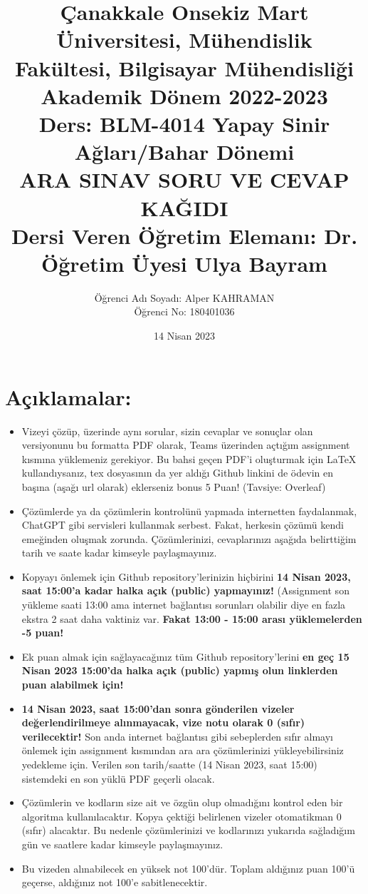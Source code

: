 \documentclass[11pt]{article}
\title{Çanakkale Onsekiz Mart Üniversitesi, Mühendislik Fakültesi, Bilgisayar Mühendisliği Akademik Dönem 2022-2023\\
Ders: BLM-4014 Yapay Sinir Ağları/Bahar Dönemi\\ 
ARA SINAV SORU VE CEVAP KAĞIDI\\
Dersi Veren Öğretim Elemanı: Dr. Öğretim Üyesi Ulya Bayram}
\author{%
\begin{minipage}{\textwidth}
\raggedright
Öğrenci Adı Soyadı: Alper KAHRAMAN\\ %
Öğrenci No: 180401036
\end{minipage}%
}
\date{14 Nisan 2023}
\begin{document}
\maketitle

\vspace{-.5in}
\section*{Açıklamalar:}
\begin{itemize}
    \item Vizeyi çözüp, üzerinde aynı sorular, sizin cevaplar ve sonuçlar olan versiyonunu bu formatta PDF olarak, Teams üzerinden açtığım assignment kısmına yüklemeniz gerekiyor. Bu bahsi geçen PDF'i oluşturmak için LaTeX kullandıysanız, tex dosyasının da yer aldığı Github linkini de ödevin en başına (aşağı url olarak) eklerseniz bonus 5 Puan! (Tavsiye: Overleaf)
    \item Çözümlerde ya da çözümlerin kontrolünü yapmada internetten faydalanmak, ChatGPT gibi servisleri kullanmak serbest. Fakat, herkesin çözümü kendi emeğinden oluşmak zorunda. Çözümlerinizi, cevaplarınızı aşağıda belirttiğim tarih ve saate kadar kimseyle paylaşmayınız. 
    \item Kopyayı önlemek için Github repository'lerinizin hiçbirini \textbf{14 Nisan 2023, saat 15:00'a kadar halka açık (public) yapmayınız!} (Assignment son yükleme saati 13:00 ama internet bağlantısı sorunları olabilir diye en fazla ekstra 2 saat daha vaktiniz var. \textbf{Fakat 13:00 - 15:00 arası yüklemelerden -5 puan!}
    \item Ek puan almak için sağlayacağınız tüm Github repository'lerini \textbf{en geç 15 Nisan 2023 15:00'da halka açık (public) yapmış olun linklerden puan alabilmek için!}
    \item \textbf{14 Nisan 2023, saat 15:00'dan sonra gönderilen vizeler değerlendirilmeye alınmayacak, vize notu olarak 0 (sıfır) verilecektir!} Son anda internet bağlantısı gibi sebeplerden sıfır almayı önlemek için assignment kısmından ara ara çözümlerinizi yükleyebilirsiniz yedekleme için. Verilen son tarih/saatte (14 Nisan 2023, saat 15:00) sistemdeki en son yüklü PDF geçerli olacak.
    \item Çözümlerin ve kodların size ait ve özgün olup olmadığını kontrol eden bir algoritma kullanılacaktır. Kopya çektiği belirlenen vizeler otomatikman 0 (sıfır) alacaktır. Bu nedenle çözümlerinizi ve kodlarınızı yukarıda sağladığım gün ve saatlere kadar kimseyle paylaşmayınız.
    \item Bu vizeden alınabilecek en yüksek not 100'dür. Toplam aldığınız puan 100'ü geçerse, aldığınız not 100'e sabitlenecektir.

\end{itemize}
\end{document}
